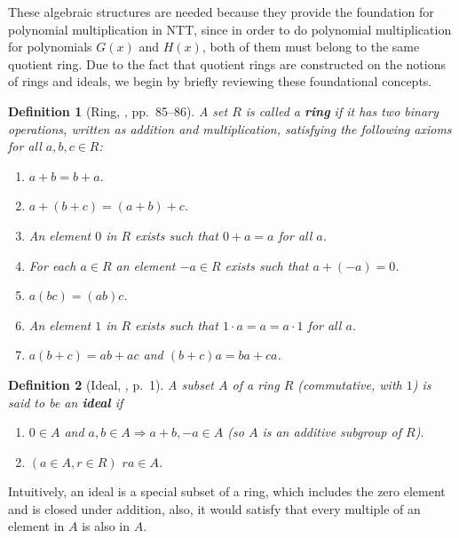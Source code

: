 \documentclass[12pt]{article}
\newtheorem{definition}{Definition}[section]
\begin{document}
These algebraic structures are needed because they provide the foundation for polynomial multiplication in NTT, 
since in order to do polynomial multiplication for polynomials $G(x)$ and $H(x)$, 
both of them must belong to the same quotient ring. 
Due to the fact that quotient rings are constructed on the notions of rings and ideals, 
we begin by briefly reviewing these foundational concepts.

\begin{definition}[Ring, \cite{algebra}, pp.~85--86]
    A set $R$ is called a \textbf{ring} if it has two binary operations, written as addition and multiplication, 
    satisfying the following axioms for all $a, b, c \in R$:
    \begin{enumerate}
        \item $a + b = b + a$.
        \item $a + (b + c) = (a + b) + c$.
        \item An element $0$ in $R$ exists such that $0 + a = a$ for all $a$.
        \item For each $a \in R$ an element $-a \in R$ exists such that $a + (-a) = 0$.
        \item $a(bc) = (ab)c$.
        \item An element $1$ in $R$ exists such that $1 \cdot a = a = a \cdot 1$ for all $a$.
        \item $a (b + c) = ab + ac$ and $(b + c)a = ba + ca$.
    \end{enumerate}
\end{definition}

\begin{definition}[Ideal, \cite{ideal_quotientring}, p.~1]
    A subset $A$ of a ring $R$ (commutative, with $1$) is said to be an \textbf{ideal} if
    \begin{enumerate}
        \item $0 \in A$ and $a, b \in A \Rightarrow a + b, -a \in A$ (so $A$ is an additive subgroup of $R$).
        \item $(a \in A, r \in R)$ $ra \in A$.
    \end{enumerate}
\end{definition}

Intuitively, 
an ideal is a special subset of a ring, 
which includes the zero element and is closed under addition, 
also, it would satisfy that every multiple of an element in $A$ is also in $A$.
\end{document}
